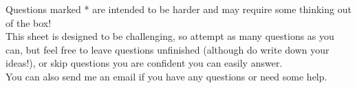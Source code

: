 \documentclass{examplesheet}
\begin{document}
\vfill
\vspace{4ex}
 {\footnotesize \itshape \color{PineGreen}\begin{center}\begin{minipage}{0.95 \textwidth} \begin{framed} 
    Questions marked * are intended to be harder and may require some thinking out of the box!
    \vspace*{3pt}\\This sheet is designed to be challenging, so attempt as many questions as you can, but feel free to leave questions unfinished (although do write down your ideas!), or skip questions you are confident you can easily answer.
    \vspace*{3pt}\\You can also send me an email if you have any questions or need some help.
\end{framed}\end{minipage}
\end{center}\color{black}}
\end{document}
